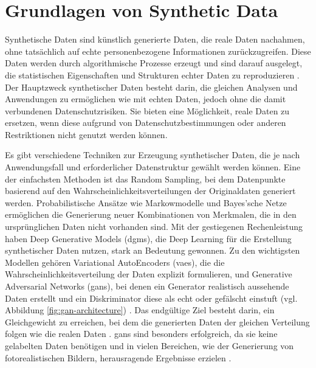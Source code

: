 \section{Grundlagen von Synthetic Data}
\label{sec:grundlagen-synthetic-data}
\begin{spacing}{1.5}

Synthetische Daten sind künstlich generierte Daten, die reale Daten nachahmen, ohne tatsächlich auf echte personenbezogene Informationen zurückzugreifen. Diese Daten werden durch algorithmische Prozesse erzeugt und sind darauf ausgelegt, die statistischen Eigenschaften und Strukturen echter Daten zu reproduzieren \cite[15]{hradec_multipurpose_2022}. Der Hauptzweck synthetischer Daten besteht darin, die gleichen Analysen und Anwendungen zu ermöglichen wie mit echten Daten, jedoch ohne die damit verbundenen Datenschutzrisiken. Sie bieten eine Möglichkeit, reale Daten zu ersetzen, wenn diese aufgrund von Datenschutzbestimmungen oder anderen Restriktionen nicht genutzt werden können.

Es gibt verschiedene Techniken zur Erzeugung synthetischer Daten, die je nach Anwendungsfall und erforderlicher Datenstruktur gewählt werden können. Eine der einfachsten Methoden ist das Random Sampling, bei dem Datenpunkte basierend auf den Wahrscheinlichkeitsverteilungen der Originaldaten generiert werden. Probabilistische Ansätze wie Markowmodelle \cite{saadi_hidden_markov_2016, huertas_generating_2018, dahmen_synsys_2019} und Bayes'sche Netze \cite{young_using_2009, kaur_application_2020, gogoshin_synthetic_2021} ermöglichen die Generierung neuer Kombinationen von Merkmalen, die in den ursprünglichen Daten nicht vorhanden sind. Mit der gestiegenen Rechenleistung haben Deep Generative Models (\acrshort{dgm}s), die Deep Learning für die Erstellung synthetischer Daten nutzen, stark an Bedeutung gewonnen. Zu den wichtigsten Modellen gehören Variational AutoEncoders (\acrshort{vae}s), die die Wahrscheinlichkeitsverteilung der Daten explizit formulieren, und Generative Adversarial Networks (\acrshort{gan}s), bei denen ein Generator realistisch aussehende Daten erstellt und ein Diskriminator diese als echt oder gefälscht einstuft (vgl. Abbildung \ref{fig:gan-architecture}) \cite[14]{hradec_multipurpose_2022}. Das endgültige Ziel besteht darin, ein Gleichgewicht zu erreichen, bei dem die generierten Daten der gleichen Verteilung folgen wie die realen Daten \cite[32]{jordon_synthetic_2022}. \acrshort{gan}s sind besonders erfolgreich, da sie keine gelabelten Daten benötigen und in vielen Bereichen, wie der Generierung von fotorealistischen Bildern, herausragende Ergebnisse erzielen \cite[7]{shrivastava_learning_2017}.


\end{spacing}

